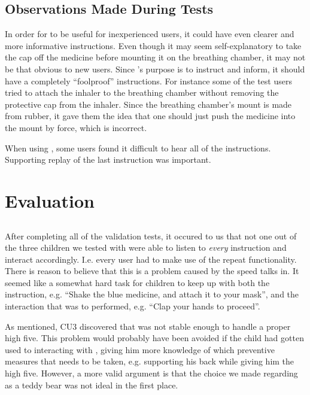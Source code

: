 \subsection{Observations Made During Tests}

In order for \ab{} to be useful for inexperienced users, it could have even clearer and more informative instructions. Even though it may seem self-explanatory to take the cap off the medicine before mounting it on the breathing chamber, it may not be that obvious to new users. Since \ab{}'s purpose is to instruct and inform, it should have a completely ``foolproof'' instructions. For instance some of the test users tried to attach the inhaler to the breathing chamber without removing the protective cap from the inhaler. Since the breathing chamber's mount is made from rubber, it gave them the idea that one should just push the medicine into the mount by force, which is incorrect. 

When using \ab{}, some users found it difficult to hear all of the instructions. Supporting replay of the last instruction was important. 



\section{Evaluation}
\subsection{\ab{}}

After completing all of the validation tests, it occured to us that not one out of the three children we tested \ab{} with were able to listen to \emph{every} instruction and interact accordingly. I.e. every user had to make use of the repeat functionality. There is reason to believe that this is a problem caused by the speed \ab{} talks in. It seemed like a somewhat hard task for children to keep up with both the instruction, e.g. ``Shake the blue medicine, and attach it to your mask'', and the interaction that was to performed, e.g. ``Clap your hands to proceed''. 

As mentioned, CU3 discovered that \ab{} was not stable enough to handle a proper high five. This problem would probably have been avoided if the child had gotten used to interacting with \ab{}, giving him more knowledge of which preventive measures that needs to be taken, e.g. supporting his back while giving him the high five. However, a more valid argument is that the choice we made regarding \ab{} as a teddy bear was not ideal in the first place.  

